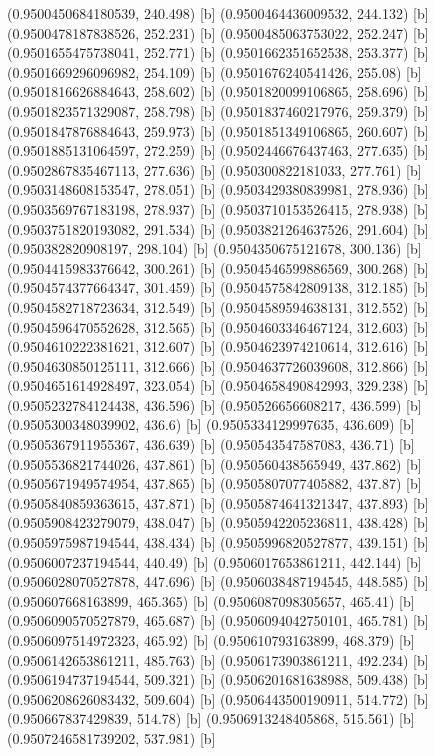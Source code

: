 {{{(0.9500450684180539, 240.498) [b] 
(0.9500464436009532, 244.132) [b] 
(0.9500478187838526, 252.231) [b] 
(0.9500485063753022, 252.247) [b] 
(0.9501655475738041, 252.771) [b] 
(0.9501662351652538, 253.377) [b] 
(0.9501669296096982, 254.109) [b] 
(0.9501676240541426, 255.08) [b] 
(0.9501816626884643, 258.602) [b] 
(0.9501820099106865, 258.696) [b] 
(0.9501823571329087, 258.798) [b] 
(0.9501837460217976, 259.379) [b] 
(0.9501847876884643, 259.973) [b] 
(0.9501851349106865, 260.607) [b] 
(0.9501885131064597, 272.259) [b] 
(0.9502446676437463, 277.635) [b] 
(0.9502867835467113, 277.636) [b] 
(0.950300822181033, 277.761) [b] 
(0.9503148608153547, 278.051) [b] 
(0.9503429380839981, 278.936) [b] 
(0.9503569767183198, 278.937) [b] 
(0.9503710153526415, 278.938) [b] 
(0.9503751820193082, 291.534) [b] 
(0.9503821264637526, 291.604) [b] 
(0.950382820908197, 298.104) [b] 
(0.9504350675121678, 300.136) [b] 
(0.9504415983376642, 300.261) [b] 
(0.9504546599886569, 300.268) [b] 
(0.9504574377664347, 301.459) [b] 
(0.9504575842809138, 312.185) [b] 
(0.9504582718723634, 312.549) [b] 
(0.9504589594638131, 312.552) [b] 
(0.9504596470552628, 312.565) [b] 
(0.9504603346467124, 312.603) [b] 
(0.9504610222381621, 312.607) [b] 
(0.9504623974210614, 312.616) [b] 
(0.9504630850125111, 312.666) [b] 
(0.9504637726039608, 312.866) [b] 
(0.9504651614928497, 323.054) [b] 
(0.9504658490842993, 329.238) [b] 
(0.9505232784124438, 436.596) [b] 
(0.950526656608217, 436.599) [b] 
(0.9505300348039902, 436.6) [b] 
(0.9505334129997635, 436.609) [b] 
(0.9505367911955367, 436.639) [b] 
(0.950543547587083, 436.71) [b] 
(0.9505536821744026, 437.861) [b] 
(0.950560438565949, 437.862) [b] 
(0.9505671949574954, 437.865) [b] 
(0.9505807077405882, 437.87) [b] 
(0.9505840859363615, 437.871) [b] 
(0.9505874641321347, 437.893) [b] 
(0.9505908423279079, 438.047) [b] 
(0.9505942205236811, 438.428) [b] 
(0.9505975987194544, 438.434) [b] 
(0.9505996820527877, 439.151) [b] 
(0.9506007237194544, 440.49) [b] 
(0.9506017653861211, 442.144) [b] 
(0.9506028070527878, 447.696) [b] 
(0.9506038487194545, 448.585) [b] 
(0.950607668163899, 465.365) [b] 
(0.9506087098305657, 465.41) [b] 
(0.9506090570527879, 465.687) [b] 
(0.9506094042750101, 465.781) [b] 
(0.9506097514972323, 465.92) [b] 
(0.950610793163899, 468.379) [b] 
(0.9506142653861211, 485.763) [b] 
(0.9506173903861211, 492.234) [b] 
(0.9506194737194544, 509.321) [b] 
(0.9506201681638988, 509.438) [b] 
(0.9506208626083432, 509.604) [b] 
(0.9506443500190911, 514.772) [b] 
(0.950667837429839, 514.78) [b] 
(0.9506913248405868, 515.561) [b] 
(0.9507246581739202, 537.981) [b] 
}}}
